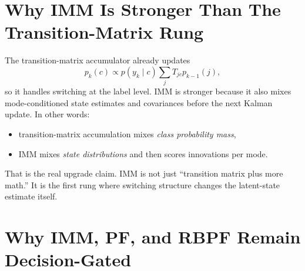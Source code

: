 \documentclass[11pt]{article}
\begin{document}
\section{Why IMM Is Stronger Than The Transition-Matrix Rung}

The transition-matrix accumulator already updates
\begin{equation}
p_k(c)
\propto
p(y_k \mid c)\sum_j T_{jc}p_{k-1}(j),
\end{equation}
so it handles switching at the label level. IMM is stronger because it also
mixes mode-conditioned state estimates and covariances before the next Kalman
update. In other words:
\begin{itemize}[leftmargin=1.5em]
    \item transition-matrix accumulation mixes \emph{class probability mass},
    \item IMM mixes \emph{state distributions} and then scores innovations per
    mode.
\end{itemize}
That is the real upgrade claim. IMM is not just ``transition matrix plus more
math.'' It is the first rung where switching structure changes the latent-state
estimate itself.

\section{Why IMM, PF, and RBPF Remain Decision-Gated}
\end{document}
